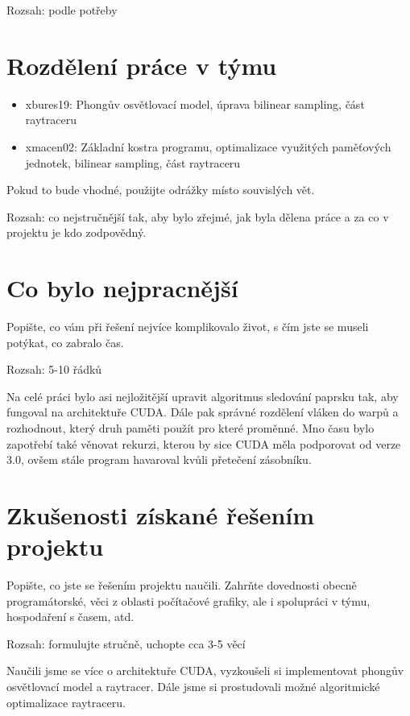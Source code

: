 \documentclass[11pt,a4paper]{article}
\begin{document}
Rozsah: podle potřeby 

\section{Rozdělení práce v týmu}

\begin{itemize}
\item xbures19: Phongův osvětlovací model, úprava bilinear sampling, část raytraceru 
\item xmacen02: Základní kostra programu, optimalizace využitých paměťových jednotek, bilinear sampling, část raytraceru 
\end{itemize}
Pokud to bude vhodné, použijte odrážky místo souvislých vět.

Rozsah: co nejstručnější tak, aby bylo zřejmé, jak byla dělena práce a za co v
projektu je kdo zodpovědný.

\section{Co bylo nejpracnější}

Popište, co vám při řešení nejvíce komplikovalo život, s čím jste se museli
potýkat, co zabralo čas.

Rozsah: 5-10 řádků

Na celé práci bylo asi nejložitější upravit algoritmus sledování paprsku tak,
aby fungoval na architektuře CUDA. Dále pak správné rozdělení vláken do warpů 
a rozhodnout, který druh paměti použít pro které proměnné. Mno času bylo zapotřebí  
také věnovat rekurzi, kterou by sice CUDA měla podporovat od verze 3.0,  
ovšem stále program havaroval kvůli přetečení zásobníku.

\section{Zkušenosti získané řešením projektu}

Popište, co jste se řešením projektu naučili. Zahrňte dovednosti obecně
programátorské, věci z oblasti počítačové grafiky, ale i spolupráci v týmu,
hospodaření s časem, atd.

Rozsah: formulujte stručně, uchopte cca 3-5 věcí

Naučili jsme se více o architektuře CUDA, vyzkoušeli si implementovat phongův osvětlovací model a
raytracer. Dále jsme si prostudovali možné algoritmické optimalizace raytraceru.
\end{document}
